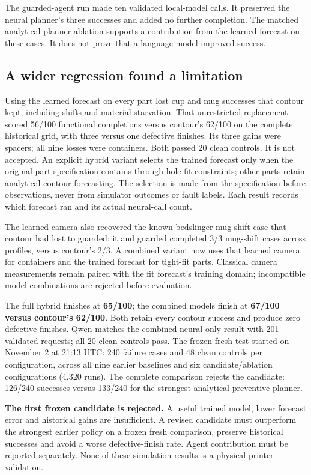 \documentclass[10pt,letterpaper]{article}
\newcommand{\note}[1]{\begin{tcolorbox}[colback=pale,colframe=teal!55,boxrule=0.5pt,arc=2pt,left=8pt,right=8pt,top=5pt,bottom=5pt]#1\end{tcolorbox}}
\begin{document}
The guarded-agent run made ten validated local-model calls. It preserved the
neural planner's three successes and added no further completion. The matched
analytical-planner ablation supports a contribution from the learned forecast
on these cases. It does not prove that a language model improved success.

\subsection*{A wider regression found a limitation}
Using the learned forecast on every part lost cup and mug successes that contour
kept, including shifts and material starvation. That unrestricted replacement
scored 56/100 functional completions versus contour's 62/100 on the complete
historical grid, with three versus one defective finishes. Its three gains were
spacers; all nine losses were containers. Both passed 20 clean controls. It is not
accepted. An explicit hybrid variant selects the trained forecast only
when the original part specification contains through-hole fit constraints;
other parts retain analytical contour forecasting. The selection is made from
the specification before observations, never from simulator outcomes or fault
labels. Each result records which forecast ran and its actual neural-call count.

The learned camera also recovered the known bedslinger mug-shift case that
contour had lost to guarded: it and guarded completed 3/3 mug-shift cases across
profiles, versus contour's 2/3. A combined variant now uses that learned camera
for containers and the trained forecast for tight-fit parts. Classical camera
measurements remain paired with the fit forecast's training domain; incompatible
model combinations are rejected before evaluation.

The full hybrid finishes at \textbf{65/100}; the combined models finish at
\textbf{67/100 versus contour's 62/100}. Both retain every contour success and
produce zero defective finishes. Qwen matches the combined neural-only result
with 201 validated requests; all 20 clean controls pass. The frozen fresh test
started on November 2 at 21:13 UTC: 240 failure cases and 48 clean controls per
configuration, across all nine earlier baselines and six candidate/ablation
configurations (4,320 runs). The complete comparison rejects the candidate:
126/240 successes versus 133/240 for the strongest analytical preventive planner.

\note{\textbf{The first frozen candidate is rejected.} A useful trained model,
lower forecast error and historical gains are insufficient. A revised candidate must
outperform the strongest earlier policy on a frozen fresh comparison, preserve
historical successes and avoid a worse defective-finish rate. Agent contribution
must be reported separately. None of these simulation results is a physical
printer validation.}
\end{document}

